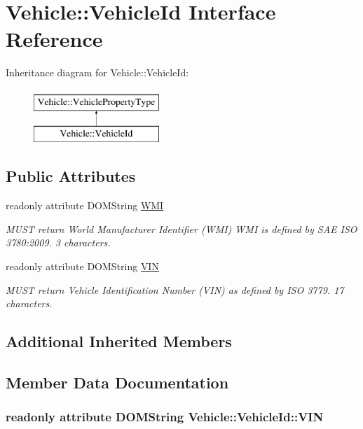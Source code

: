 \hypertarget{interfaceVehicle_1_1VehicleId}{\section{Vehicle\-:\-:Vehicle\-Id Interface Reference}
\label{interfaceVehicle_1_1VehicleId}
}
Inheritance diagram for Vehicle\-:\-:Vehicle\-Id\-:\begin{figure}[H]
\begin{center}
\leavevmode
\includegraphics[height=2.000000cm]{interfaceVehicle_1_1VehicleId}
\end{center}
\end{figure}
\subsection*{Public Attributes}
\begin{DoxyCompactItemize}
\item 
readonly attribute D\-O\-M\-String \hyperlink{interfaceVehicle_1_1VehicleId_a1b58c3d71e2d7f99d401c25fa3d1d8c9}{W\-M\-I}
\begin{DoxyCompactList}\small\item\em M\-U\-S\-T return World Manufacturer Identifier (W\-M\-I) W\-M\-I is defined by S\-A\-E I\-S\-O 3780\-:2009. 3 characters. \end{DoxyCompactList}\item 
readonly attribute D\-O\-M\-String \hyperlink{interfaceVehicle_1_1VehicleId_a3b51510c58fd59b423b4b752aad10ca9}{V\-I\-N}
\begin{DoxyCompactList}\small\item\em M\-U\-S\-T return Vehicle Identification Number (V\-I\-N) as defined by I\-S\-O 3779. 17 characters. \end{DoxyCompactList}\end{DoxyCompactItemize}
\subsection*{Additional Inherited Members}


\subsection{Member Data Documentation}
\hypertarget{interfaceVehicle_1_1VehicleId_a3b51510c58fd59b423b4b752aad10ca9}{
\subsubsection[{V\-I\-N}]{\setlength{\rightskip}{0pt plus 5cm}readonly attribute D\-O\-M\-String Vehicle\-::\-Vehicle\-Id\-::\-V\-I\-N}}\label{interfaceVehicle_1_1VehicleId_a3b51510c58fd59b423b4b752aad10ca9}


